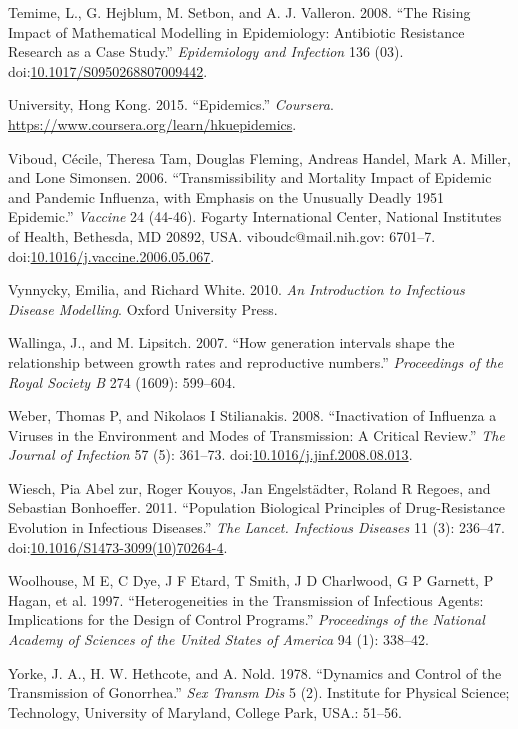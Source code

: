 \documentclass[]{book}
\theoremstyle{definition}
\theoremstyle{definition}
\theoremstyle{definition}
\theoremstyle{remark}
\begin{document}
\hypertarget{ref-temime08}{}
Temime, L., G. Hejblum, M. Setbon, and A. J. Valleron. 2008. ``The
Rising Impact of Mathematical Modelling in Epidemiology: Antibiotic
Resistance Research as a Case Study.'' \emph{Epidemiology and Infection}
136 (03).
doi:\href{https://doi.org/10.1017/S0950268807009442}{10.1017/S0950268807009442}.

\hypertarget{ref-hkepidemics}{}
University, Hong Kong. 2015. ``Epidemics.'' \emph{Coursera}.
\url{https://www.coursera.org/learn/hkuepidemics}.

\hypertarget{ref-viboud06}{}
Viboud, Cécile, Theresa Tam, Douglas Fleming, Andreas Handel, Mark A.
Miller, and Lone Simonsen. 2006. ``Transmissibility and Mortality Impact
of Epidemic and Pandemic Influenza, with Emphasis on the Unusually
Deadly 1951 Epidemic.'' \emph{Vaccine} 24 (44-46). Fogarty International
Center, National Institutes of Health, Bethesda, MD 20892, USA.
viboudc@mail.nih.gov: 6701--7.
doi:\href{https://doi.org/10.1016/j.vaccine.2006.05.067}{10.1016/j.vaccine.2006.05.067}.

\hypertarget{ref-vynnycky10}{}
Vynnycky, Emilia, and Richard White. 2010. \emph{An Introduction to
Infectious Disease Modelling}. Oxford University Press.

\hypertarget{ref-wallinga07}{}
Wallinga, J., and M. Lipsitch. 2007. ``How generation intervals shape
the relationship between growth rates and reproductive numbers.''
\emph{Proceedings of the Royal Society B} 274 (1609): 599--604.

\hypertarget{ref-weber08}{}
Weber, Thomas P, and Nikolaos I Stilianakis. 2008. ``Inactivation of
Influenza a Viruses in the Environment and Modes of Transmission: A
Critical Review.'' \emph{The Journal of Infection} 57 (5): 361--73.
doi:\href{https://doi.org/10.1016/j.jinf.2008.08.013}{10.1016/j.jinf.2008.08.013}.

\hypertarget{ref-wiesch11}{}
Wiesch, Pia Abel zur, Roger Kouyos, Jan Engelstädter, Roland R Regoes,
and Sebastian Bonhoeffer. 2011. ``Population Biological Principles of
Drug-Resistance Evolution in Infectious Diseases.'' \emph{The Lancet.
Infectious Diseases} 11 (3): 236--47.
doi:\href{https://doi.org/10.1016/S1473-3099(10)70264-4}{10.1016/S1473-3099(10)70264-4}.

\hypertarget{ref-woolhouse97}{}
Woolhouse, M E, C Dye, J F Etard, T Smith, J D Charlwood, G P Garnett, P
Hagan, et al. 1997. ``Heterogeneities in the Transmission of Infectious
Agents: Implications for the Design of Control Programs.''
\emph{Proceedings of the National Academy of Sciences of the United
States of America} 94 (1): 338--42.

\hypertarget{ref-yorke78}{}
Yorke, J. A., H. W. Hethcote, and A. Nold. 1978. ``Dynamics and Control
of the Transmission of Gonorrhea.'' \emph{Sex Transm Dis} 5 (2).
Institute for Physical Science; Technology, University of Maryland,
College Park, USA.: 51--56.
\end{document}
